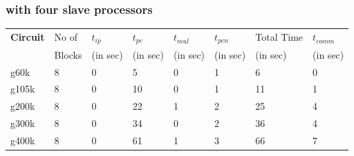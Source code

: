 \documentclass[12pt,psfig,a4]{article}
\begin{document}
\subsubsection{with four slave processors}
\tiny
\begin{table}[ht]
\begin{center}
\begin{tabular}{|l|l|l|l|l|l|l|l|} 
\hline
{\bf Circuit} & No of & $t_{ip}$ & $t_{pc}$ & $t_{mul}$ &  $t_{pcn}$ & Total Time & $t_{comm}$ \\ 
              & Blocks& (in sec)& (in sec)  & (in sec)  &  (in sec)  & (in sec)   & (in sec)   \\ \hline 
g60k&  \hspace{0.2in}8 & \hspace{0.2in}0 & \hspace{0.2in} 5& \hspace{0.2in}0& \hspace{0.2in}1& \hspace{0.2in} 6& \hspace{0.2in}0     \\ \hline 
g105k& \hspace{0.2in}8 & \hspace{0.2in}0 & \hspace{0.2in}10& \hspace{0.2in}0& \hspace{0.2in}1& \hspace{0.2in}11& \hspace{0.2in}1     \\ \hline 
g200k& \hspace{0.2in}8 & \hspace{0.2in}0 & \hspace{0.2in}22& \hspace{0.2in}1& \hspace{0.2in}2& \hspace{0.2in}25& \hspace{0.2in}4     \\ \hline 
g300k& \hspace{0.2in}8 & \hspace{0.2in}0 & \hspace{0.2in}34& \hspace{0.2in}0& \hspace{0.2in}2& \hspace{0.2in}36& \hspace{0.2in}4   \\ \hline 
g400k& \hspace{0.2in}8 & \hspace{0.2in}0 & \hspace{0.2in}61& \hspace{0.2in}1& \hspace{0.2in}3& \hspace{0.2in}66& \hspace{0.2in}7   \\ \hline 

\end{tabular}
\end{center}
\end{table}
\end{document}
